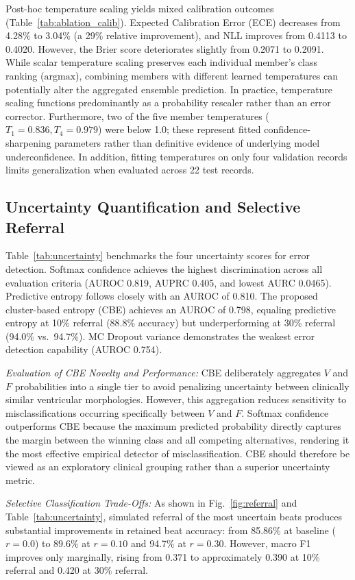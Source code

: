 \documentclass[conference]{IEEEtran}
\begin{document}
Post-hoc temperature scaling yields mixed calibration outcomes (Table~\ref{tab:ablation_calib}). Expected Calibration Error (ECE) decreases from 4.28\% to 3.04\% (a 29\% relative improvement), and NLL improves from 0.4113 to 0.4020. However, the Brier score deteriorates slightly from 0.2071 to 0.2091. While scalar temperature scaling preserves each individual member's class ranking ($\mathrm{argmax}$), combining members with different learned temperatures can potentially alter the aggregated ensemble prediction. In practice, temperature scaling functions predominantly as a probability rescaler rather than an error corrector. Furthermore, two of the five member temperatures ($T_1=0.836, T_4=0.979$) were below 1.0; these represent fitted confidence-sharpening parameters rather than definitive evidence of underlying model underconfidence. In addition, fitting temperatures on only four validation records limits generalization when evaluated across 22 test records.

\subsection{Uncertainty Quantification and Selective Referral}
Table~\ref{tab:uncertainty} benchmarks the four uncertainty scores for error detection. Softmax confidence achieves the highest discrimination across all evaluation criteria (AUROC 0.819, AUPRC 0.405, and lowest AURC 0.0465). Predictive entropy follows closely with an AUROC of 0.810. The proposed cluster-based entropy (CBE) achieves an AUROC of 0.798, equaling predictive entropy at 10\% referral (88.8\% accuracy) but underperforming at 30\% referral (94.0\% vs.\ 94.7\%). MC Dropout variance demonstrates the weakest error detection capability (AUROC 0.754).

\textit{Evaluation of CBE Novelty and Performance:} CBE deliberately aggregates $V$ and $F$ probabilities into a single tier to avoid penalizing uncertainty between clinically similar ventricular morphologies. However, this aggregation reduces sensitivity to misclassifications occurring specifically between $V$ and $F$. Softmax confidence outperforms CBE because the maximum predicted probability directly captures the margin between the winning class and all competing alternatives, rendering it the most effective empirical detector of misclassification. CBE should therefore be viewed as an exploratory clinical grouping rather than a superior uncertainty metric.

\textit{Selective Classification Trade-Offs:} As shown in Fig.~\ref{fig:referral} and Table~\ref{tab:uncertainty}, simulated referral of the most uncertain beats produces substantial improvements in retained beat accuracy: from 85.86\% at baseline ($r=0.0$) to 89.6\% at $r=0.10$ and 94.7\% at $r=0.30$. However, macro F1 improves only marginally, rising from 0.371 to approximately 0.390 at 10\% referral and 0.420 at 30\% referral.
\end{document}
